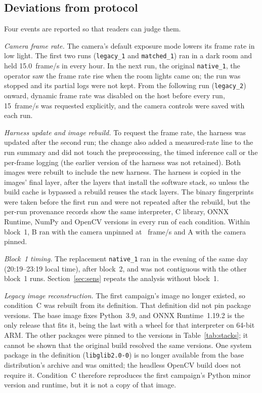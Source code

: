 \documentclass[10pt,journal,compsoc]{IEEEtran}
\begin{document}
\subsection{Deviations from protocol}\label{sec:deviations}
Four events are reported so that readers can judge them.

\emph{Camera frame rate.} The camera's default exposure mode lowers its frame rate in low light. The first two runs (\texttt{legacy\_1} and \texttt{matched\_1}) ran in a dark room and held 15.0~frame/s in every hour. In the next run, the original \texttt{native\_1}, the operator saw the frame rate rise when the room lights came on; the run was stopped and its partial logs were not kept. From the following run (\texttt{legacy\_2}) onward, dynamic frame rate was disabled on the host before every run, 15~frame/s was requested explicitly, and the camera controls were saved with each run.

\emph{Harness update and image rebuild.} To request the frame rate, the harness was updated after the second run; the change also added a measured-rate line to the run summary and did not touch the preprocessing, the timed inference call or the per-frame logging (the earlier version of the harness was not retained). Both images were rebuilt to include the new harness. The harness is copied in the images' final layer, after the layers that install the software stack, so unless the build cache is bypassed a rebuild reuses the stack layers. The binary fingerprints were taken before the first run and were not repeated after the rebuild, but the per-run provenance records show the same interpreter, C library, ONNX Runtime, NumPy and OpenCV versions in every run of each condition. Within block~1, B ran with the camera unpinned at \FPSEarlyMax~frame/s and A with the camera pinned.

\emph{Block~1 timing.} The replacement \texttt{native\_1} ran in the evening of the same day (20:19--23:19 local time), after block~2, and was not contiguous with the other block~1 runs. Section~\ref{sec:sens} repeats the analysis without block~1.

\emph{Legacy image reconstruction.} The first campaign's image no longer existed, so condition~C was rebuilt from its definition. That definition did not pin package versions. The base image fixes Python~3.9, and ONNX Runtime~1.19.2 is the only release that fits it, being the last with a wheel for that interpreter on 64-bit ARM. The other packages were pinned to the versions in Table~\ref{tab:stacks}; it cannot be shown that the original build resolved the same versions. One system package in the definition (\texttt{libglib2.0-0}) is no longer available from the base distribution's archive and was omitted; the headless OpenCV build does not require it. Condition~C therefore reproduces the first campaign's Python minor version and runtime, but it is not a copy of that image.
\end{document}
